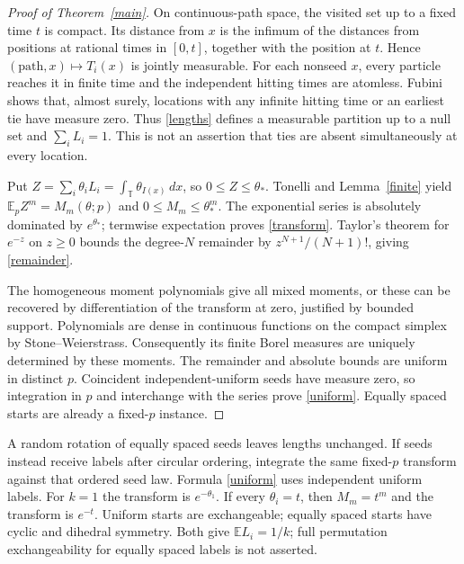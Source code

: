 \documentclass[11pt]{article}
\newcommand{\T}{\mathbb T}
\newcommand{\E}{\mathbb E}
\begin{document}
\begin{proof}[Proof of Theorem~\ref{main}]
On continuous-path space, the visited set up to a fixed time $t$ is
compact. Its distance from $x$ is the infimum of the distances from
positions at rational times in $[0,t]$, together with the position at
$t$. Hence $(\text{path},x)\mapsto T_i(x)$ is jointly measurable.
For each nonseed $x$, every particle reaches it in finite time and the
independent hitting times are atomless. Fubini shows that, almost
surely, locations with any infinite hitting time or an earliest tie
have measure zero. Thus \eqref{lengths} defines a measurable partition
up to a null set and $\sum_iL_i=1$. This is not an assertion that ties
are absent simultaneously at every location.

Put $Z=\sum_i\theta_iL_i=\int_\T\theta_{I(x)}\,dx$, so
$0\leq Z\leq\theta_*$. Tonelli and Lemma~\ref{finite} yield
$\E_p Z^m=M_m(\theta;p)$ and $0\leq M_m\leq\theta_*^m$.
The exponential series is absolutely dominated by $e^{\theta_*}$;
termwise expectation proves \eqref{transform}. Taylor's theorem for
$e^{-z}$ on $z\geq0$ bounds the degree-$N$ remainder by
$z^{N+1}/(N+1)!$, giving \eqref{remainder}.

The homogeneous moment polynomials give all mixed moments, or these
can be recovered by differentiation of the transform at zero, justified
by bounded support. Polynomials are dense in continuous functions on
the compact simplex by Stone--Weierstrass. Consequently its finite
Borel measures are uniquely determined by these moments.
The remainder and absolute bounds are uniform in distinct $p$.
Coincident independent-uniform seeds have measure zero, so integration
in $p$ and interchange with the series prove \eqref{uniform}.
Equally spaced starts are already a fixed-$p$ instance.
\end{proof}

A random rotation of equally spaced seeds leaves lengths unchanged.
If seeds instead receive labels after circular ordering, integrate the
same fixed-$p$ transform against that ordered seed law. Formula
\eqref{uniform} uses independent uniform labels.
For $k=1$ the transform is $e^{-\theta_1}$. If every $\theta_i=t$,
then $M_m=t^m$ and the transform is $e^{-t}$. Uniform starts are
exchangeable; equally spaced starts have cyclic and dihedral symmetry.
Both give $\E L_i=1/k$; full permutation exchangeability for equally
spaced labels is not asserted.
\end{document}
